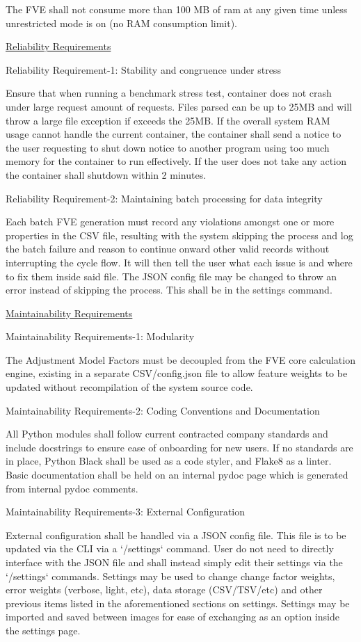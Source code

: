 The FVE shall not consume more than 100 MB of ram at any given time
unless unrestricted mode is on (no RAM consumption limit).

\ul{Reliability Requirements}

Reliability Requirement-1: Stability and congruence under stress

Ensure that when running a benchmark stress test, container does not
crash under large request amount of requests. Files parsed can be up to
25MB and will throw a large file exception if exceeds the 25MB. If the
overall system RAM usage cannot handle the current container, the
container shall send a notice to the user requesting to shut down notice
to another program using too much memory for the container to run
effectively. If the user does not take any action the container shall
shutdown within 2 minutes.

Reliability Requirement-2: Maintaining batch processing for data
integrity

Each batch FVE generation must record any violations amongst one or more
properties in the CSV file, resulting with the system skipping the
process and log the batch failure and reason to continue onward other
valid records without interrupting the cycle flow. It will then tell the
user what each issue is and where to fix them inside said file. The JSON
config file may be changed to throw an error instead of skipping the
process. This shall be in the settings command.

\ul{Maintainability Requirements}

Maintainability Requirements-1: Modularity

The Adjustment Model Factors must be decoupled from the FVE core
calculation engine, existing in a separate CSV/config.json file to allow
feature weights to be updated without recompilation of the system source
code.

Maintainability Requirements-2: Coding Conventions and Documentation

All Python modules shall follow current contracted company standards and
include docstrings to ensure ease of onboarding for new users. If no
standards are in place, Python Black shall be used as a code styler, and
Flake8 as a linter. Basic documentation shall be held on an internal
pydoc page which is generated from internal pydoc comments.

Maintainability Requirements-3: External Configuration

External configuration shall be handled via a JSON config file. This
file is to be updated via the CLI via a `/settings` command. User do not
need to directly interface with the JSON file and shall instead simply
edit their settings via the `/settings` commands. Settings may be used
to change change factor weights, error weights (verbose, light, etc),
data storage (CSV/TSV/etc) and other previous items listed in the
aforementioned sections on settings. Settings may be imported and saved
between images for ease of exchanging as an option inside the settings
page.

